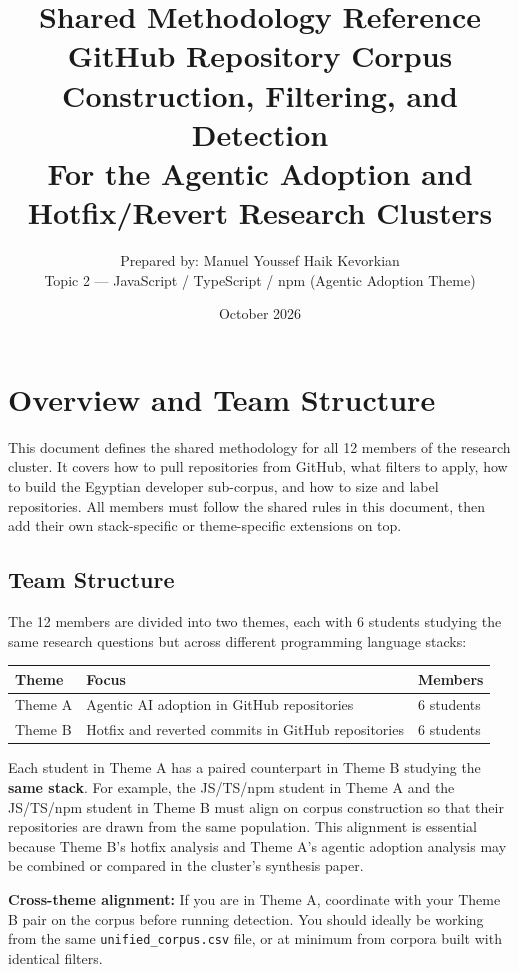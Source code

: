 \documentclass[11pt,a4paper]{article}
\title{
    \textbf{Shared Methodology Reference} \\[0.5em]
    \large GitHub Repository Corpus Construction, Filtering, and Detection \\[0.3em]
    \normalsize For the Agentic Adoption and Hotfix/Revert Research Clusters
}
\author{
    Prepared by: Manuel Youssef Haik Kevorkian \\
    \small Topic 2 — JavaScript / TypeScript / npm (Agentic Adoption Theme)
}
\date{October 2026}
\begin{document}
\maketitle
\tableofcontents
\newpage

\section{Overview and Team Structure}

This document defines the shared methodology for all 12 members of the research cluster. It covers how to pull repositories from GitHub, what filters to apply, how to build the Egyptian developer sub-corpus, and how to size and label repositories. All members must follow the shared rules in this document, then add their own stack-specific or theme-specific extensions on top.

\subsection{Team Structure}

The 12 members are divided into two themes, each with 6 students studying the same research questions but across different programming language stacks:

\begin{center}
\begin{tabular}{lll}
\toprule
\textbf{Theme} & \textbf{Focus} & \textbf{Members} \\
\midrule
Theme A & Agentic AI adoption in GitHub repositories & 6 students \\
Theme B & Hotfix and reverted commits in GitHub repositories & 6 students \\
\bottomrule
\end{tabular}
\end{center}

Each student in Theme A has a paired counterpart in Theme B studying the \textbf{same stack}. For example, the JS/TS/npm student in Theme A and the JS/TS/npm student in Theme B must align on corpus construction so that their repositories are drawn from the same population. This alignment is essential because Theme B's hotfix analysis and Theme A's agentic adoption analysis may be combined or compared in the cluster's synthesis paper.

\begin{notebox}
\textbf{Cross-theme alignment:} If you are in Theme A, coordinate with your Theme B pair on the corpus before running detection. You should ideally be working from the same \texttt{unified\_corpus.csv} file, or at minimum from corpora built with identical filters.
\end{notebox}
\end{document}
